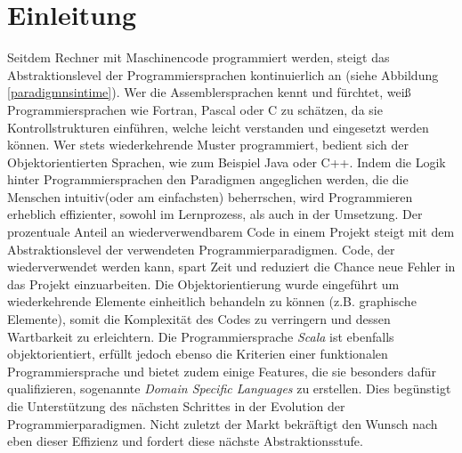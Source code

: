 \chapter{Einleitung}
Seitdem Rechner mit Maschinencode programmiert werden, steigt das Abstraktionslevel der Programmiersprachen kontinuierlich an (siehe Abbildung \ref{paradigmnsintime}). Wer die Assemblersprachen kennt und fürchtet, weiß Programmiersprachen wie Fortran, Pascal oder C zu schätzen, da sie Kontrollstrukturen einführen, welche leicht verstanden und eingesetzt werden können. Wer stets wiederkehrende Muster programmiert, bedient sich der Objektorientierten Sprachen, wie zum Beispiel Java oder C++.
Indem die Logik hinter Programmiersprachen den Paradigmen angeglichen werden, die die Menschen intuitiv(oder am einfachsten) beherrschen, wird Programmieren erheblich effizienter, sowohl im Lernprozess, als auch in der Umsetzung. 
Der prozentuale Anteil an wiederverwendbarem Code in einem Projekt steigt mit dem Abstraktionslevel der verwendeten Programmierparadigmen. Code, der wiederverwendet werden kann, spart Zeit und reduziert die Chance neue Fehler in das Projekt einzuarbeiten. Die Objektorientierung wurde eingeführt um wiederkehrende Elemente einheitlich behandeln zu können (z.B. graphische Elemente), somit die Komplexität des Codes zu verringern und dessen Wartbarkeit zu erleichtern. Die Programmiersprache \textit{Scala} ist ebenfalls objektorientiert, erfüllt jedoch ebenso die Kriterien einer funktionalen Programmiersprache und bietet zudem einige Features, die sie besonders dafür qualifizieren, sogenannte \textit{Domain Specific Languages} zu erstellen. Dies begünstigt die Unterstützung des nächsten Schrittes in der Evolution der Programmierparadigmen. Nicht zuletzt der Markt bekräftigt den Wunsch nach eben dieser Effizienz und fordert diese nächste Abstraktionsstufe. 
